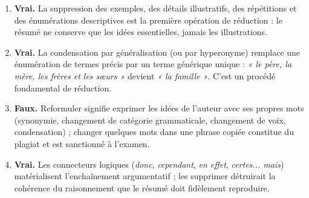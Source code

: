 \documentclass[11pt]{article}
\begin{document}
\begin{corrige}
\begin{enumerate}
    \item \textbf{Vrai.} La suppression des exemples, des détails illustratifs, des répétitions et des énumérations descriptives est la première opération de réduction : le résumé ne conserve que les idées essentielles, jamais les illustrations.
    \item \textbf{Vrai.} La condensation par généralisation (ou par hyperonyme) remplace une énumération de termes précis par un terme générique unique : \emph{« le père, la mère, les frères et les sœurs »} devient \emph{« la famille »}. C'est un procédé fondamental de réduction.
    \item \textbf{Faux.} Reformuler signifie exprimer les idées de l'auteur avec ses propres mots (synonymie, changement de catégorie grammaticale, changement de voix, condensation) ; changer quelques mots dans une phrase copiée constitue du plagiat et est sanctionné à l'examen.
    \item \textbf{Vrai.} Les connecteurs logiques (\emph{donc}, \emph{cependant}, \emph{en effet}, \emph{certes... mais}) matérialisent l'enchaînement argumentatif ; les supprimer détruirait la cohérence du raisonnement que le résumé doit fidèlement reproduire.
\end{enumerate}
\end{corrige}
\end{document}
